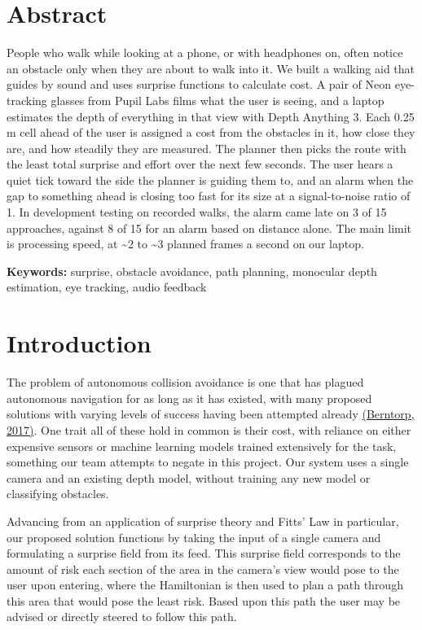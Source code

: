 \documentclass[a4paper]{article}
\begin{document}
\section{Abstract} \label{abstract}

People who walk while looking at a phone, or with headphones on, often notice an obstacle only when they are about to walk into it. We built a walking aid that guides by sound and uses surprise functions to calculate cost. A pair of Neon eye-tracking glasses from Pupil Labs films what the user is seeing, and a laptop estimates the depth of everything in that view with Depth Anything 3. Each 0.25 m cell ahead of the user is assigned a cost from the obstacles in it, how close they are, and how steadily they are measured. The planner then picks the route with the least total surprise and effort over the next few seconds. The user hears a quiet tick toward the side the planner is guiding them to, and an alarm when the gap to something ahead is closing too fast for its size at a signal-to-noise ratio of 1. In development testing on recorded walks, the alarm came late on 3 of 15 approaches, against 8 of 15 for an alarm based on distance alone. The main limit is processing speed, at \textasciitilde 2 to \textasciitilde 3 planned frames a second on our laptop.

\textbf{Keywords:} surprise, obstacle avoidance, path planning, monocular depth estimation, eye tracking, audio feedback

\section{Introduction} \label{introduction}
The problem of autonomous collision avoidance is one that has plagued autonomous navigation for as long as it has existed, with many proposed solutions with varying levels of success having been attempted already \hyperref[references]{(Berntorp, 2017)}. One trait all of these hold in common is their cost, with reliance on either expensive sensors or machine learning models trained extensively for the task, something our team attempts to negate in this project. Our system uses a single camera and an existing depth model, without training any new model or classifying obstacles.

Advancing from an application of surprise theory and Fitts' Law in particular, our proposed solution functions by taking the input of a single camera and formulating a surprise field from its feed. This surprise field corresponds to the amount of risk each section of the area in the camera's view would pose to the user upon entering, where the Hamiltonian is then used to plan a path through this area that would pose the least risk. Based upon this path the user may be advised or directly steered to follow this path.
\end{document}
